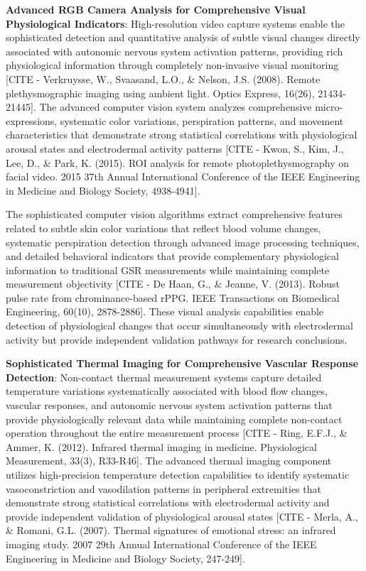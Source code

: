 \documentclass[12pt,a4paper]{report}
\begin{document}
\textbf{Advanced RGB Camera Analysis for Comprehensive Visual Physiological Indicators}: High-resolution video capture
systems enable the sophisticated detection and quantitative analysis of subtle visual changes directly associated with
autonomic nervous system activation patterns, providing rich physiological information through completely non-invasive
visual
monitoring [CITE - Verkruysse, W., Svaasand, L.O., \& Nelson, J.S. (2008). Remote plethysmographic imaging using ambient light. Optics Express, 16(26), 21434-21445].
The advanced computer vision system analyzes comprehensive micro-expressions, systematic color variations, perspiration
patterns, and movement characteristics that demonstrate strong statistical correlations with physiological arousal
states and electrodermal activity
patterns [CITE - Kwon, S., Kim, J., Lee, D., \& Park, K. (2015). ROI analysis for remote photoplethysmography on facial video. 2015 37th Annual International Conference of the IEEE Engineering in Medicine and Biology Society, 4938-4941].

The sophisticated computer vision algorithms extract comprehensive features related to subtle skin color variations that
reflect blood volume changes, systematic perspiration detection through advanced image processing techniques, and
detailed behavioral indicators that provide complementary physiological information to traditional GSR measurements
while maintaining complete measurement
objectivity [CITE - De Haan, G., \& Jeanne, V. (2013). Robust pulse rate from chrominance-based rPPG. IEEE Transactions on Biomedical Engineering, 60(10), 2878-2886].
These visual analysis capabilities enable detection of physiological changes that occur simultaneously with
electrodermal activity but provide independent validation pathways for research conclusions.

\textbf{Sophisticated Thermal Imaging for Comprehensive Vascular Response Detection}: Non-contact thermal measurement systems
capture detailed temperature variations systematically associated with blood flow changes, vascular responses, and
autonomic nervous system activation patterns that provide physiologically relevant data while maintaining complete
non-contact operation throughout the entire measurement
process [CITE - Ring, E.F.J., \& Ammer, K. (2012). Infrared thermal imaging in medicine. Physiological Measurement, 33(3), R33-R46].
The advanced thermal imaging component utilizes high-precision temperature detection capabilities to identify systematic
vasoconstriction and vasodilation patterns in peripheral extremities that demonstrate strong statistical correlations
with electrodermal activity and provide independent validation of physiological arousal
states [CITE - Merla, A., \& Romani, G.L. (2007). Thermal signatures of emotional stress: an infrared imaging study. 2007 29th Annual International Conference of the IEEE Engineering in Medicine and Biology Society, 247-249].
\end{document}
